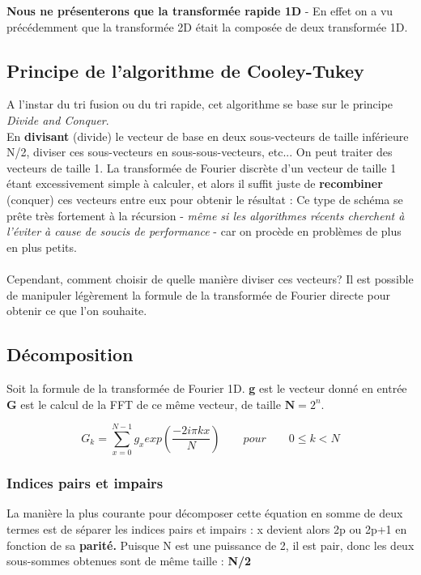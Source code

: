 \documentclass{article}
\begin{document}
\noindent \textbf{Nous ne présenterons que la transformée rapide 1D} - En effet on a vu précédemment que la transformée 2D était la composée de deux transformée 1D.

\subsection{Principe de l'algorithme de Cooley-Tukey}

A l'instar du tri fusion ou du tri rapide, cet algorithme se base sur le principe \textit{Divide and Conquer}. \\
En \textbf{divisant} (divide) le vecteur de base en deux sous-vecteurs de taille inférieure N/2, diviser ces sous-vecteurs en sous-sous-vecteurs, etc... On peut traiter des vecteurs de taille 1. La transformée de Fourier discrète d'un vecteur de taille 1 étant excessivement simple à calculer, et alors il suffit juste de \textbf{recombiner} (conquer) ces vecteurs entre eux pour obtenir le résultat : Ce type de schéma se prête très fortement à la récursion - \textit{même si les algorithmes récents cherchent à l'éviter à cause de soucis de performance} - car on procède en problèmes de plus en plus petits.\\~\\
Cependant, comment choisir de quelle manière diviser ces vecteurs? Il est possible de manipuler légèrement la formule de la transformée de Fourier directe pour obtenir ce que l'on souhaite.

\subsection{Décomposition}

Soit la formule de la transformée de Fourier 1D. \textbf{g} est le vecteur donné en entrée \textbf{G} est le calcul de la FFT de ce même vecteur, de taille $\textbf{N} = 2^{n}$.

\begin{equation}
	G_{k} = \sum_{x = 0}^{N-1}g_{x} exp(\frac{-2i\pi kx}{N}) \qquad pour \qquad 0 \leq k < N
\end{equation}

\subsubsection{Indices pairs et impairs}

La manière la plus courante pour décomposer cette équation en somme de deux termes est de séparer les indices pairs et impairs : x devient alors 2p ou 2p+1 en fonction de sa \textbf{parité.} Puisque N est une puissance de 2, il est pair, donc les deux sous-sommes obtenues sont de même taille : \textbf{N/2}
\end{document}

